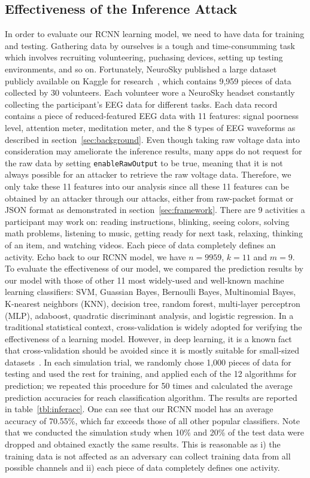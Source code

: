 \subsection{Effectiveness of the Inference Attack}
In order to evaluate our RCNN learning model, we need to have data for training and testing. Gathering data by ourselves is a tough and time-consumming task which involves recruiting volunteering, puchasing devices, setting up testing environments, and so on. Fortunately, NeuroSky published a large dataset publicly available on Kaggle for research~\cite{neuroskydata}, which contains 9,959 pieces of data collected by 30 volunteers. Each volunteer wore a NeuroSky headset constantly collecting the participant's EEG data for different tasks. Each data record contains a piece of reduced-featured EEG data with 11 features: signal poorness level, attention meter, meditation meter, and the 8 types of EEG waveforms as described in section~\ref{sec:background}. Even though taking raw voltage data into consideration may ameliorate the inference results, many apps do not request for the raw data by setting \texttt{enableRawOutput} to be true, meaning that it is not always possible for an attacker to retrieve the raw voltage data. Therefore, we only take these 11 features into our analysis since all these 11 features can be obtained by an attacker through our attacks, either from raw-packet format or JSON format as demonstrated in section~\ref{sec:framework}. There are 9 activities a participant may work on: reading instructions, blinking, seeing colors, solving math problems, listening to music, getting ready for next task, relaxing, thinking of an item, and watching videos. Each piece of data completely defines an activity. Echo back to our RCNN model, we have $n=9959$, $k=11$ and $m=9$.\\
%
\indent To evaluate the effectiveness of our model, we compared the prediction results by our model with those of other 11 most widely-used and well-known machine learning classifiers: SVM, Guassian Bayes, Bernoulli Bayes, Multinomial Bayes, K-nearest neighbors (KNN), decision tree, random forest, multi-layer perceptron (MLP), adaboost, quadratic discriminant analysis, and logistic regression. In a traditional statistical context, cross-validation is widely adopted for verifying the effectiveness of a learning model. However, in deep learning, it is a known fact that cross-validation should be avoided  since it is mostly suitable for small-sized datasets~\cite{deepcrossvalid}. In each simulation trial, we randomly chose 1,000 pieces of data for testing and used the rest for training, and applied each of the 12 algorithms for prediction; we repeated this procedure for 50 times and calculated the average prediction accuracies for reach classification algorithm. The results are reported in table~\ref{tbl:inferacc}. One can see that our RCNN model has an average accuracy of 70.55\%, which far exceeds those of all other popular classifiers. Note that we conducted the simulation study when 10\% and 20\% of the test data were dropped and obtained exactly the same results. This is reasonable as i) the training data is not affected as an adversary can collect training data from all possible channels and ii) each piece of data completely defines one activity.

